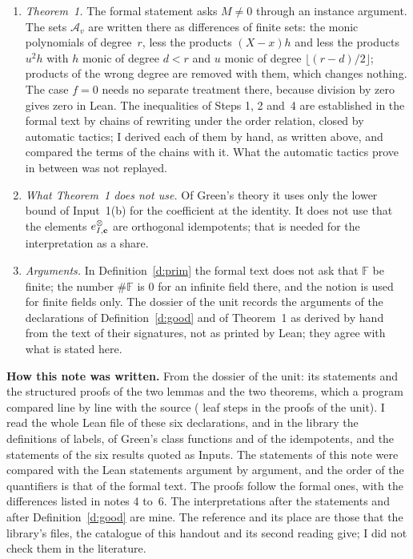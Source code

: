 \documentclass[11pt,a4paper]{article}
\newcommand{\F}{\mathbb{F}}
\newcommand{\m}[1]{\mbox{$#1$}}        %
\newcommand{\subhead}[1]{\par\addvspace{9pt plus 2pt}\Needspace{4\baselineskip}\noindent\textbf{#1}\enspace\ignorespaces}
\theoremstyle{plainx}
\theoremstyle{uprightx}
\begin{document}
\begin{enumerate}[label=\textup{\arabic*.},leftmargin=1.6em,itemsep=5pt]
\m{M=0} cannot occur, since $0$ does not divide \m{\#\F-1}.
\item \emph{Theorem~1.} The formal statement asks \m{M\ne0} through an instance argument. The sets
$\mathcal A_v$ are written there as differences of finite sets: the monic polynomials of degree~$r$, less the
products \m{(X-x)h} and less the products \m{u^2h} with $h$ monic of degree \m{d<r} and $u$ monic of degree
\m{\lfloor(r-d)/2\rfloor}; products of the wrong degree are removed with them, which changes nothing. The
case \m{f=0} needs no separate treatment there, because division by zero gives zero in Lean. The inequalities of
Steps 1, 2 and~4 are established in the formal text by chains of rewriting under the order relation, closed by
automatic tactics; I derived each of them by hand, as written above, and compared the terms of the chains with it.
What the automatic tactics prove in between was not replayed.
\item \emph{What Theorem~1 does not use.} Of Green's theory it uses only the lower bound of Input~1(b) for the
coefficient at the identity. It does not use that the elements \m{\tupleIdem{I}{\mathbf c}} are orthogonal
idempotents; that is needed for the interpretation as a share.
\item \emph{Arguments.} In Definition~\ref{d:prim} the formal text does not ask that $\F$ be finite; the number
\m{\#\F} is $0$ for an infinite field there, and the notion is used for finite fields only. The dossier of the
unit records the arguments of the declarations of Definition~\ref{d:good} and of Theorem~1 as derived by hand
from the text of their signatures, not as printed by Lean; they agree with what is stated here.
\end{enumerate}

\subhead{How this note was written.} From the dossier of the unit: its statements and the structured proofs of
the two lemmas and the two theorems, which a program compared line by line with the source (\UnitSteps{} leaf
steps in the \UnitProofs{} proofs of the unit). I read the whole Lean file of these six declarations, and in the
library the definitions of labels, of Green's class functions and of the idempotents, and the statements of the
six results quoted as Inputs. The statements of this note were compared with the Lean statements argument by
argument, and the order of the quantifiers is that of the formal text. The proofs follow the formal ones, with
the differences listed in notes 4 to~6. The interpretations after the statements and after
Definition~\ref{d:good} are mine. The reference and its place are those that the library's files, the catalogue of this
handout and its second reading give; I did not check them in the literature.
\end{document}
